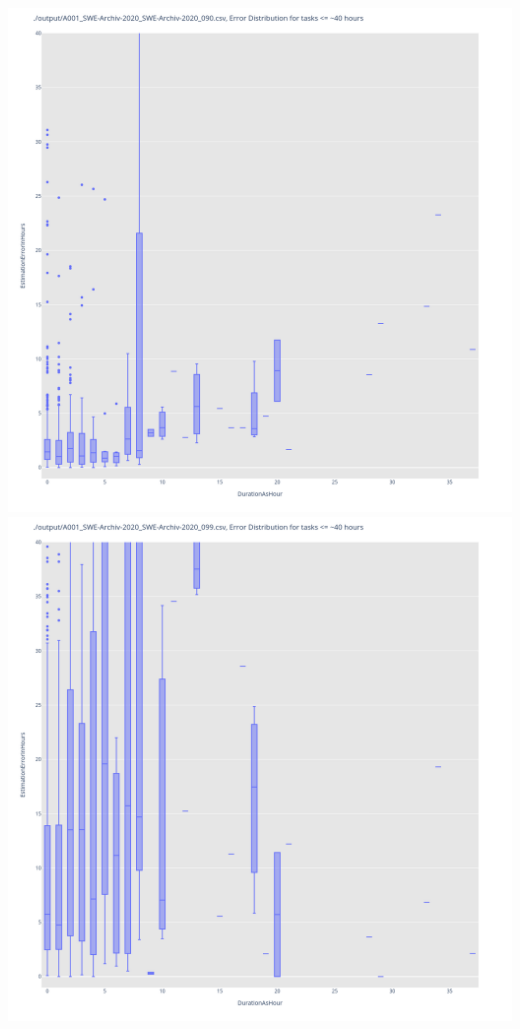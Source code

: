 \includegraphics[width=\textwidth]{Scripts/output/A001_SWE-Archiv-2020_SWE-Archiv-2020_090.csv.error_distribution.png}
\includegraphics[width=\textwidth]{Scripts/output/A001_SWE-Archiv-2020_SWE-Archiv-2020_099.csv.error_distribution.png}
